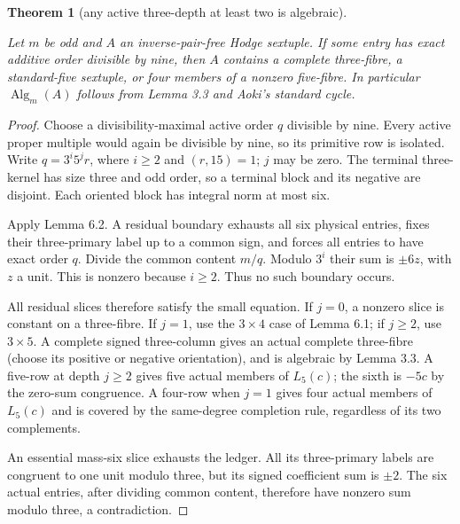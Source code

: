 \documentclass[11pt]{amsart}
\newtheorem{theorem}{Theorem}
\numberwithin{theorem}{section}
\theoremstyle{remark}
\numberwithin{equation}{section}
\begin{document}
\begin{theorem}[any active three-depth at least two is algebraic]\label{theorem:7.1}

Let \(m\) be odd and \(A\) an inverse-pair-free Hodge sextuple. If some
entry has exact additive order divisible by nine, then \(A\) contains a
complete three-fibre, a standard-five sextuple, or four members of a
nonzero five-fibre. In particular \(\operatorname{Alg}_m(A)\) follows
from Lemma 3.3 and Aoki's standard cycle.

\end{theorem}
\begin{proof}

Choose a divisibility-maximal active order \(q\) divisible by nine.
Every active proper multiple would again be divisible by nine, so its
primitive row is isolated. Write \(q=3^i5^jr\), where \(i\ge2\) and
\((r,15)=1\); \(j\) may be zero. The terminal three-kernel has size
three and odd order, so a terminal block and its negative are disjoint.
Each oriented block has integral norm at most six.

Apply Lemma 6.2. A residual boundary exhausts all six physical entries,
fixes their three-primary label up to a common sign, and forces all
entries to have exact order \(q\). Divide the common content \(m/q\).
Modulo \(3^i\) their sum is \(\pm6z\), with \(z\) a unit. This is
nonzero because \(i\ge2\). Thus no such boundary occurs.

All residual slices therefore satisfy the small equation. If \(j=0\),
a nonzero slice is constant on a three-fibre. If \(j=1\), use the
\(3\times4\) case of Lemma 6.1; if \(j\ge2\), use \(3\times5\).
A complete signed three-column gives an actual complete three-fibre
(choose its positive or negative orientation), and is algebraic by
Lemma 3.3. A five-row at depth \(j\ge2\) gives five actual members of
\(L_5(c)\); the sixth is \(-5c\) by the zero-sum congruence. A four-row
when \(j=1\) gives four actual members of \(L_5(c)\) and is covered by
the same-degree completion rule, regardless of its two complements.

An essential mass-six slice exhausts the ledger. All its three-primary
labels are congruent to one unit modulo three, but its signed coefficient
sum is \(\pm2\). The six actual entries, after dividing common content,
therefore have nonzero sum modulo three, a contradiction.


\end{proof}
\end{document}
